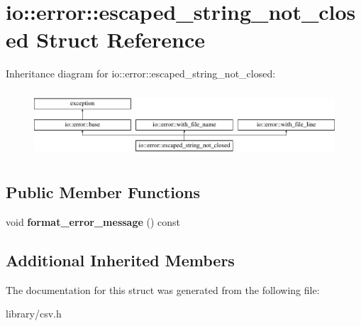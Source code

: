 \hypertarget{structio_1_1error_1_1escaped__string__not__closed}{}\section{io\+:\+:error\+:\+:escaped\+\_\+string\+\_\+not\+\_\+closed Struct Reference}
\label{structio_1_1error_1_1escaped__string__not__closed}
Inheritance diagram for io\+:\+:error\+:\+:escaped\+\_\+string\+\_\+not\+\_\+closed\+:\begin{figure}[H]
\begin{center}
\leavevmode
\includegraphics[height=2.488889cm]{structio_1_1error_1_1escaped__string__not__closed}
\end{center}
\end{figure}
\subsection*{Public Member Functions}
\begin{DoxyCompactItemize}
\item 
\mbox{\label{structio_1_1error_1_1escaped__string__not__closed_a696911cd3cfaf8a30a728101b076028d}} 
void {\bfseries format\+\_\+error\+\_\+message} () const
\end{DoxyCompactItemize}
\subsection*{Additional Inherited Members}


The documentation for this struct was generated from the following file\+:\begin{DoxyCompactItemize}
\item 
library/csv.\+h\end{DoxyCompactItemize}
